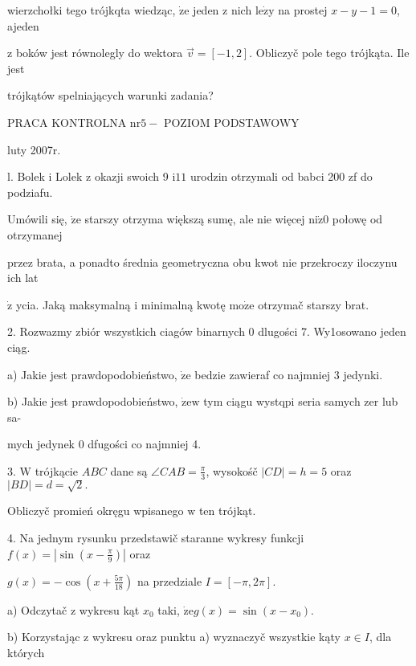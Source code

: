 \documentclass[a4paper,12pt]{article}
\begin{document}
wierzchołki tego trójkqta wiedząc, $\dot{\mathrm{z}}\mathrm{e}$ jeden $\mathrm{z}$ nich $\mathrm{l}\mathrm{e}\dot{\mathrm{z}}\mathrm{y}$ na prostej $x-y-1=0$, ajeden

$\mathrm{z}$ boków jest równolegly do wektora $\vec{v}= [-1,2]$. Obliczyč pole tego trójkąta. Ile jest

trójkątów spelniających warunki zadania?





PRACA KONTROLNA $\mathrm{n}\mathrm{r}5-$ POZIOM PODSTAWOWY

luty 2007r.

l. Bolek $\mathrm{i}$ Lolek $\mathrm{z}$ okazji swoich 9 $\mathrm{i} 11$ urodzin otrzymali od babci 200 zf do podziafu.

Umówili się, $\dot{\mathrm{z}}\mathrm{e}$ starszy otrzyma większą sumę, ale nie więcej $\mathrm{n}\mathrm{i}\dot{\mathrm{z}}0$ połowę od otrzymanej

przez brata, a ponadto średnia geometryczna obu kwot nie przekroczy iloczynu ich lat

$\dot{\mathrm{z}}$ ycia. Jaką maksymalną $\mathrm{i}$ minimalną kwotę $\mathrm{m}\mathrm{o}\dot{\mathrm{z}}\mathrm{e}$ otrzymač starszy brat.

2. Rozwazmy zbiór wszystkich ciagów binarnych $0$ dlugości 7. Wy1osowano jeden ciąg.

a) Jakie jest prawdopodobieństwo, $\dot{\mathrm{z}}\mathrm{e}$ bedzie zawieraf co najmniej 3 jedynki.

b) Jakie jest prawdopodobieństwo, $\dot{\mathrm{z}}\mathrm{e}\mathrm{w}$ tym ciągu wystqpi seria samych zer lub sa-

mych jedynek $0$ dfugości co najmniej 4.

3. $\mathrm{W}$ trójkącie $ABC$ dane są $\displaystyle \angle CAB=\frac{\pi}{3}$, wysokośč $|CD| =h=5$ oraz $|BD| =d=\sqrt{2}.$

Obliczyč promień okręgu wpisanego $\mathrm{w}$ ten trójkąt.

4. Na jednym rysunku przedstawič staranne wykresy funkcji $f(x) = |\displaystyle \sin(x-\frac{\pi}{9})|$ oraz

$g(x)=-\displaystyle \cos(x+\frac{5\pi}{18})$ na przedziale $I=[-\pi,2\pi].$

a) Odczytač $\mathrm{z}$ wykresu kąt $x_{0}$ taki, $\dot{\mathrm{z}}\mathrm{e}g(x)=\sin(x-x_{0}).$

b) Korzystając $\mathrm{z}$ wykresu oraz punktu a) wyznaczyč wszystkie kąty $x\in I$, dla których
\end{document}
